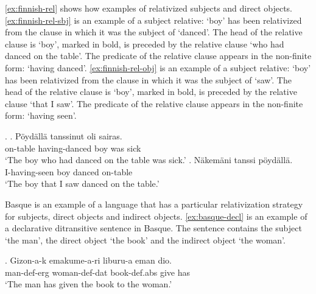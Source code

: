 \ref{ex:finnish-rel} shows how examples of relativized subjects and direct objects.
\ref{ex:finnish-rel-sbj} is an example of a subject relative:  `boy' has been relativized from the clause in which it was the subject of  `danced'. The head of the relative clause is  `boy', marked in bold, is preceded by the relative clause  `who had danced on the table'. The predicate of the relative clause appears in the non-finite form:  `having danced'.
\ref{ex:finnish-rel-obj} is an example of a subject relative:  `boy' has been relativized from the clause in which it was the subject of  `saw'. The head of the relative clause is  `boy', marked in bold, is preceded by the relative clause  `that I saw'. The predicate of the relative clause appears in the non-finite form:  `having seen'.

\ex.\label{ex:finnish-rel}
\ag. Pöydällä tanssinut  oli sairas.\\
 on-table having-danced boy was sick\\
 `The boy who had danced on the table was sick.'\label{ex:finnish-rel-sbj}
\bg. Näkemäni  tanssi pöydällä.\\
 I-having-seen boy danced on-table\\
 `The boy that I saw danced on the table.'\label{ex:finnish-rel-obj}

Basque is an example of a language that has a particular relativization strategy for subjects, direct objects and indirect objects. \ref{ex:basque-decl} is an example of a declarative ditransitive sentence in Basque. The sentence contains the subject  `the man', the direct object  `the book' and the indirect object  `the woman'.

\exg. Gizon-a-k emakume-a-ri liburu-a eman dio.\\
 man-\ac{def}-\ac{erg} woman-\ac{def}-\ac{dat} book-\ac{def}.\ac{abs} give has\\
 `The man has given the book to the woman.' \label{ex:basque-decl}

